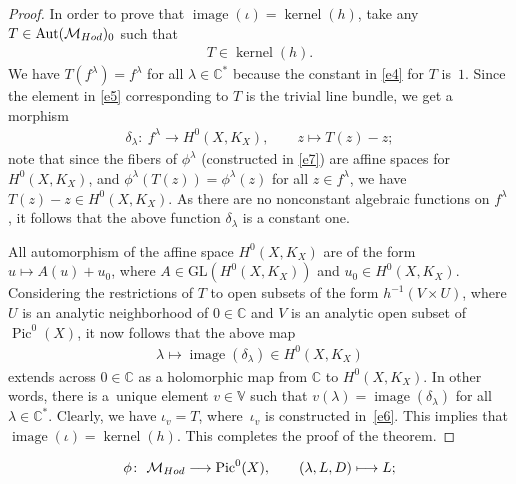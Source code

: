 \documentclass[11pt]{article}
\numberwithin{equation}{section}
\begin{document}
\begin{proof}
In order to prove that $\operatorname{image}(\iota) = \operatorname{kernel}(h)$, take any $T \in \operatorname{Aut}({\mathcal M}_{\rm Hod})_0$ such that
\begin{gather*}T \in \operatorname{kernel}(h) .\end{gather*} We have $T(f^\lambda) = f^\lambda$ for all
$\lambda \in {\mathbb C}^*$ because the constant in \eqref{e4} for $T$ is~$1$. Since the element in \eqref{e5} corresponding to $T$ is the trivial line bundle, we get a morphism
\begin{gather*}
\delta_\lambda \colon \  f^\lambda \longrightarrow H^0(X, K_X) ,\qquad z \longmapsto T(z) - z ;
\end{gather*}
note that since the f\/ibers of $\phi^\lambda$ (constructed in \eqref{e7}) are af\/f\/ine spaces for $H^0(X, K_X)$, and $\phi^\lambda(T(z)) = \phi^\lambda(z)$ for all $z \in f^\lambda$, we have $T(z) - z \in H^0(X, K_X)$. As there are no nonconstant algebraic functions on $f^\lambda$ \cite[Proposition~2.2]{BBS}, it follows that the above function $\delta_\lambda$ is a constant one.

All automorphism of the af\/f\/ine space $H^0(X, K_X)$ are of the form $u \longmapsto A(u)+u_0$, where $A \in \text{GL}(H^0(X, K_X))$ and $u_0 \in H^0(X, K_X)$. Considering the restrictions of $T$ to open subsets of the form $h^{-1}(V\times U)$, where $U$ is an analytic neighborhood of $0 \in \mathbb C$ and $V$ is an analytic open subset of $\operatorname{Pic}^0(X)$, it now follows that the above map
\begin{gather*}\lambda \longmapsto \operatorname{image}(\delta_\lambda) \in H^0(X, K_X)\end{gather*}
extends across $0 \in \mathbb C$ as a holomorphic map from $\mathbb C$ to $H^0(X, K_X)$. In other words, there is a~unique element $v \in {\mathbb V}$ such that $v(\lambda) = \operatorname{image} (\delta_\lambda)$ for all $\lambda \in {\mathbb C}^*$. Clearly, we have $\iota_v = T$, where~$\iota_v$ is constructed in~\eqref{e6}. This implies that $\operatorname{image}(\iota) = \operatorname{kernel}(h)$. This completes the proof of the theorem.
\end{proof}

\setcounter{section}{2}
\setcounter{subsection}{2}
\setcounter{subsubsection}{0}
\setcounter{Theorem}{2}
\setcounter{equation}{7}
\begin{gather}\label{phi}
\phi \colon \ {\mathcal M}_{\rm Hod} \longrightarrow \operatorname{Pic}^0(X) ,\qquad (\lambda, L, D) \longmapsto L ;
\end{gather}
\end{document}
